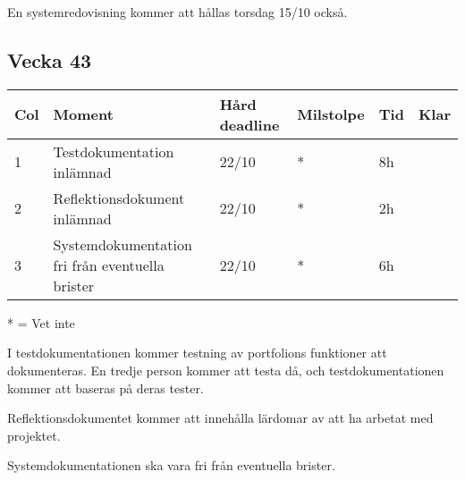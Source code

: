 \documentclass{TDP003mall}
\begin{document}
En systemredovisning kommer att hållas torsdag 15/10 också.

\subsection*{Vecka 43}
\begin{table}[!h]
\begin{tabularx}{\linewidth}{|l|X|l|l|l|l|}
\hline
Col & Moment & Hård deadline & Milstolpe & Tid & Klar \\\hline
1 & Testdokumentation inlämnad & 22/10 & * & 8h \\\hline
2 & Reflektionsdokument inlämnad & 22/10 & * & 2h \\\hline
3 & Systemdokumentation fri från eventuella brister & 22/10 & * & 6h \\\hline
\end{tabularx}
\end{table}
* = Vet inte

I testdokumentationen kommer testning av portfolions funktioner att dokumenteras. En tredje person kommer att testa då, och testdokumentationen kommer att baseras på deras tester.

Reflektionsdokumentet kommer att innehålla lärdomar av att ha arbetat med projektet.

Systemdokumentationen ska vara fri från eventuella brister.
\end{document}
